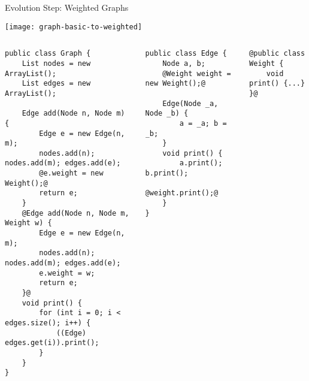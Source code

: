\begin{frame}[fragile]{Evolution Step: Weighted Graphs}
	\vspace{-1.5cm}
	\begin{flushright}
		\texttt{[image: graph-basic-to-weighted]}
	\end{flushright}
	\vspace{0.1cm}
	\begin{tiny}
		\begin{columns}
\begin{lstlisting}
public class Graph {
	List nodes = new ArrayList();
	List edges = new ArrayList();

	Edge add(Node n, Node m) {
		Edge e = new Edge(n, m);
		nodes.add(n); nodes.add(m); edges.add(e);
		@e.weight = new Weight();@
		return e;
	}
	@Edge add(Node n, Node m, Weight w) {
		Edge e = new Edge(n, m);
		nodes.add(n); nodes.add(m); edges.add(e);
		e.weight = w;
		return e;
	}@
	void print() {
		for (int i = 0; i < edges.size(); i++) {
			((Edge) edges.get(i)).print();
		}
	}
}
\end{lstlisting}
\begin{lstlisting}
public class Edge {
	Node a, b;
	@Weight weight = new Weight();@

	Edge(Node _a, Node _b) {
		a = _a; b = _b;
	}
	void print() {
		a.print(); b.print();
		@weight.print();@
	}
}
\end{lstlisting}
\begin{lstlisting}
@public class Weight {
	void print() {...}
}@
\end{lstlisting}
		\end{columns}
	\end{tiny}
\end{frame}

